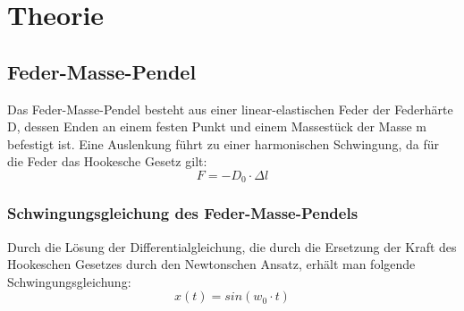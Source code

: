 \section{Theorie}
\subsection{Feder-Masse-Pendel}
Das Feder-Masse-Pendel besteht aus einer linear-elastischen Feder der Federhärte D, dessen Enden an einem festen Punkt und einem Massestück der Masse m befestigt ist.
Eine Auslenkung führt zu einer harmonischen Schwingung, da für die Feder das Hookesche Gesetz gilt:
\begin{equation}
F = -D_{0} \cdot \Delta l 
\end{equation}
\subsubsection{Schwingungsgleichung des Feder-Masse-Pendels}
Durch die Lösung der Differentialgleichung, die durch die Ersetzung der Kraft des Hookeschen Gesetzes durch den Newtonschen Ansatz, erhält man folgende Schwingungsgleichung:
\begin{equation}
        x(t) = sin(w_{0}\cdot t)
\end{equation}